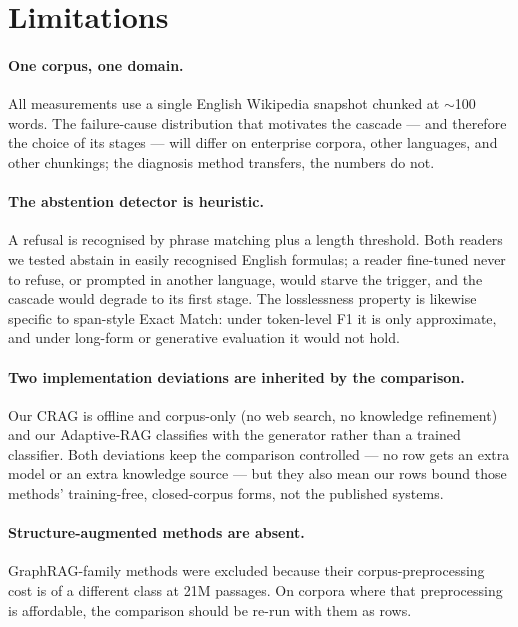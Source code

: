 \section{Limitations}
\label{sec:limitations}

\paragraph{One corpus, one domain.} All measurements use a single English
Wikipedia snapshot chunked at $\sim$100 words. The failure-cause
distribution that motivates the cascade --- and therefore the choice of
its stages --- will differ on enterprise corpora, other languages, and
other chunkings; the diagnosis method transfers, the numbers do not.

\paragraph{The abstention detector is heuristic.} A refusal is recognised
by phrase matching plus a length threshold. Both readers we tested
abstain in easily recognised English formulas; a reader fine-tuned never
to refuse, or prompted in another language, would starve the trigger, and
the cascade would degrade to its first stage. The losslessness property
is likewise specific to span-style Exact Match: under token-level F1 it
is only approximate, and under long-form or generative evaluation it
would not hold.

\paragraph{Two implementation deviations are inherited by the
comparison.} Our CRAG is offline and corpus-only (no web search, no
knowledge refinement) and our Adaptive-RAG classifies with the generator
rather than a trained classifier. Both deviations keep the comparison
controlled --- no row gets an extra model or an extra knowledge source ---
but they also mean our rows bound those methods' training-free, closed-corpus
forms, not the published systems.

\paragraph{Structure-augmented methods are absent.} GraphRAG-family
methods were excluded because their corpus-preprocessing cost is of a
different class at 21M passages. On corpora where that preprocessing is
affordable, the comparison should be re-run with them as rows.

